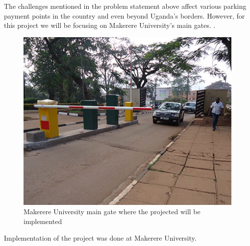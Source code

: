 The challenges mentioned in the problem statement above affect various parking payment points in the country and even beyond Uganda's borders. However, for this project we will be focusing on Makerere University's main gates. .

\begin{figure}
    \begin{center}
        \includegraphics[scale = 0.6]{images/gate}
        \caption{Makerere University main gate where the projected will be implemented}
    \end{center}
\end{figure}
Implementation of the project was done at Makerere University.
